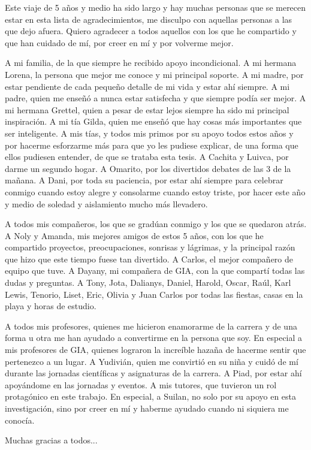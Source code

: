 \begin{acknowledgements}

Este viaje de 5 años y medio ha sido largo y hay muchas personas que se merecen estar en esta lista de agradecimientos, me disculpo con aquellas personas a las que dejo afuera. Quiero agradecer a todos aquellos con los que he compartido y que han cuidado de mí, por creer en mí y por volverme mejor.

A mi familia, de la que siempre he recibido apoyo incondicional. A mi hermana Lorena, la persona que mejor me conoce y mi principal soporte. A mi madre, por estar pendiente de cada pequeño detalle de mi vida y estar ahí siempre. A mi padre, quien me enseñó a nunca estar satisfecha y que siempre podía ser mejor. A mi hermana Grettel, quien a pesar de estar lejos siempre ha sido mi principal inspiración. A mi tía Gilda, quien me enseñó que hay cosas más importantes que ser inteligente. A mis tías, y todos mis primos por su apoyo todos estos años y por hacerme esforzarme más para que yo les pudiese explicar, de una forma que ellos pudiesen entender, de que se trataba esta tesis. A Cachita y Luivca, por darme un segundo hogar. A Omarito, por los divertidos debates de las 3 de la mañana. A Dani, por toda su paciencia, por estar ahí siempre para celebrar conmigo cuando estoy alegre y consolarme cuando estoy triste, por hacer este año y medio de soledad y aislamiento mucho más llevadero.%


A todos mis compañeros, los que se gradúan conmigo y los que se quedaron atrás. A Noly y Amanda, mis mejores amigos de estos 5 años, con los que he compartido proyectos, preocupaciones, sonrisas y lágrimas, y la principal razón que hizo que este tiempo fuese tan divertido. A Carlos, el mejor compañero de equipo que tuve. A Dayany, mi compañera de GIA, con la que compartí todas las dudas y preguntas. A Tony, Jota, Dalianys, Daniel, Harold, Oscar, Raúl, Karl Lewis, Tenorio, Liset, Eric, Olivia y Juan Carlos por todas las fiestas, casas en la playa y horas de estudio.

A todos mis profesores, quienes me hicieron enamorarme de la carrera y de una forma u otra me han ayudado a convertirme en la persona que soy. En especial a mis profesores de GIA, quienes lograron la increíble hazaña de hacerme sentir que pertenezco a un lugar. A Yudivián, quien me convirtió en su niña y cuidó de mí durante las jornadas científicas y asignaturas de la carrera. A Piad, por estar ahí apoyándome en las jornadas y eventos. A mis tutores, que tuvieron un rol protagónico en este trabajo. En especial, a Suilan, no solo por su apoyo en esta investigación, sino por creer en mí y haberme ayudado cuando ni siquiera me conocía. 


Muchas gracias a todos...

\end{acknowledgements}